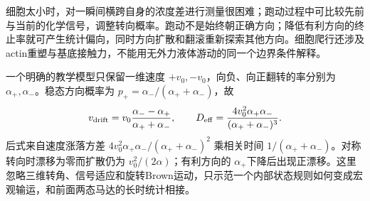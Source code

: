 细胞太小时，对一瞬间横跨自身的浓度差进行测量很困难；跑动过程中可比较先前与当前的化学信号，调整转向概率。跑动不是始终朝正确方向；降低有利方向的终止率就可产生统计偏向，同时方向扩散和翻滚重新探索其他方向。细胞爬行还涉及actin重塑与基底接触力，不能用无外力液体游动的同一个边界条件解释。

一个明确的教学模型只保留一维速度 $+v_0,-v_0$，向负、向正翻转的率分别为 $\alpha_+,\alpha_-$。稳态方向概率为 $p_+=\alpha_-/(\alpha_++\alpha_-)$，故
\[
 v_{\rm drift}=v_0\frac{\alpha_--\alpha_+}{\alpha_++\alpha_-},\qquad
 D_{\rm eff}=\frac{4v_0^2\alpha_+\alpha_-}{(\alpha_++\alpha_-)^3}.
\]
后式来自速度涨落方差 $4v_0^2\alpha_+\alpha_-/(\alpha_++\alpha_-)^2$ 乘相关时间 $1/(\alpha_++\alpha_-)$。对称转向时漂移为零而扩散仍为 $v_0^2/(2\alpha)$；有利方向的 $\alpha_+$下降后出现正漂移。这里忽略三维转角、信号适应和旋转Brown运动，只示范一个内部状态规则如何变成宏观输运，和前面两态马达的长时统计相接。

